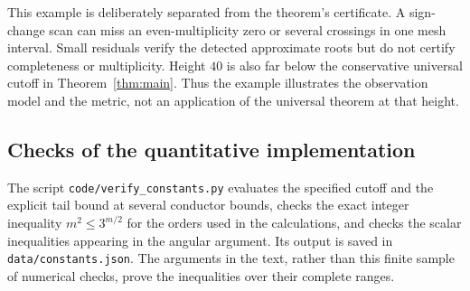 This example is deliberately separated from the theorem's
certificate. A sign-change scan can miss an even-multiplicity zero
or several crossings in one mesh interval. Small residuals verify
the detected approximate roots but do not certify completeness or
multiplicity. Height $40$ is also far below the conservative
universal cutoff in Theorem~\ref{thm:main}. Thus the example
illustrates the observation model and the metric, not an application
of the universal theorem at that height.

\subsection{Checks of the quantitative implementation}

The script \texttt{code/verify\_constants.py} evaluates the specified
cutoff and the explicit tail bound at several conductor bounds,
checks the exact integer inequality $m^2\le3^{m/2}$ for the orders
used in the calculations, and checks the scalar inequalities
appearing in the angular argument. Its output is saved in
\texttt{data/constants.json}. The arguments in the text, rather
than this finite sample of numerical checks, prove the inequalities
over their complete ranges.
